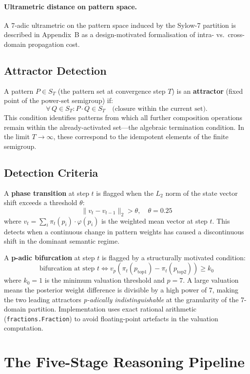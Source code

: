 \documentclass{llncs}
\begin{document}
\paragraph{Ultrametric distance on pattern space.}
A 7-adic ultrametric on the pattern space induced by the Sylow-7 partition is
described in Appendix~B as a design-motivated formalisation of intra- vs.\ cross-domain
propagation cost.

\subsection{Attractor Detection}

A pattern $P \in S_T$ (the pattern set at convergence step $T$) is an
\textbf{attractor} (fixed point of the power-set semigroup) if:
\[
  \forall\, Q \in S_T \colon P \cdot Q \in S_T
  \quad \text{(closure within the current set).}
\]
This condition identifies patterns from which all further composition
operations remain within the already-activated set---the algebraic
termination condition. In the limit $T \to \infty$, these correspond to
the idempotent elements of the finite semigroup.

\subsection{Detection Criteria}

A \textbf{phase transition} at step $t$ is flagged when the $L_2$ norm of
the state vector shift exceeds a threshold $\theta$:
\[
  \|v_t - v_{t-1}\|_2 > \theta, \quad \theta = 0.25
\]
where $v_t = \sum_i \pi_t(p_i) \cdot \varphi(p_i)$ is the weighted mean
vector at step $t$. This detects when a continuous change in pattern weights
has caused a discontinuous shift in the dominant semantic regime.

A \textbf{p-adic bifurcation} at step $t$ is flagged by a structurally
motivated condition:
\[
  \text{bifurcation at step } t
  \iff
  v_p\!\left(\pi_t(p_{\mathrm{top1}}) - \pi_t(p_{\mathrm{top2}})\right) \geq k_0
\]
where $k_0 = 1$ is the minimum valuation threshold and $p = 7$. A large
valuation means the posterior weight difference is divisible by a high power
of 7, making the two leading attractors \emph{p-adically indistinguishable}
at the granularity of the 7-domain partition. Implementation uses exact
rational arithmetic (\texttt{fractions.Fraction}) to avoid floating-point
artefacts in the valuation computation.

\section{The Five-Stage Reasoning Pipeline}
\end{document}
